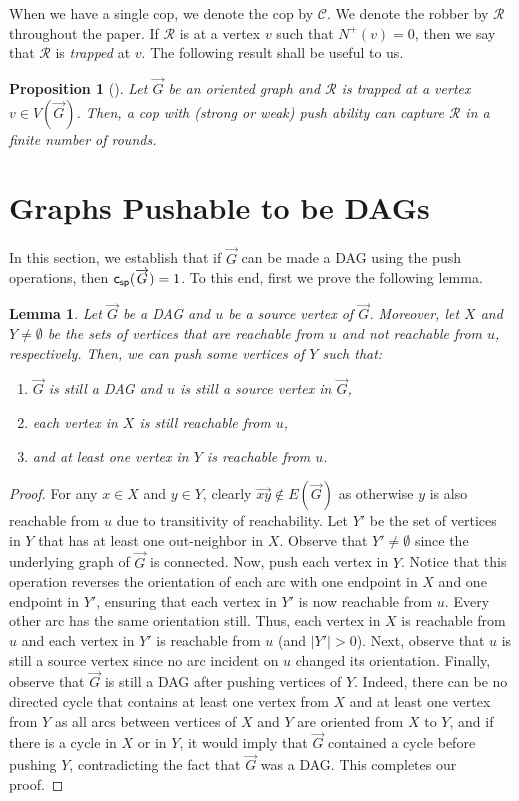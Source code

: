 \documentclass[a4paper,12pt]{amsart}
\newtheorem{proposition}[theorem]{Proposition}
\newtheorem{lemma}[theorem]{Lemma}
\newcommand{\R}{\mathcal{R}}
\newcommand{\C}{\mathcal{C}}
\newcommand{\csp}[1]{{\sf c_{sp}}(\overrightarrow{#1})}
\begin{document}
When we have a single cop, we denote the cop by $\C$. We denote the robber by $\R$ throughout the paper. 
If $\R$ is at a vertex $v$ such that $N^+(v) = 0$, then we say that $\R$ is \textit{trapped} at $v$. The following result shall be useful to us.
\begin{proposition}[\cite{das2023cops}]\label{P:trap}
    Let $\overrightarrow{G}$ be an oriented graph and $\R$ is trapped at a vertex $v\in V(\overrightarrow{G})$. Then, a cop with (strong or weak) push ability can capture $\R$ in a finite number of rounds.
\end{proposition}


\section{Graphs Pushable to be DAGs}
In this section, we establish that if $\overrightarrow{G}$ can be made a DAG using the push operations, then $\csp{G} = 1$. To this end, first we prove the following lemma. 
\begin{lemma}\label{L:pushDAG}
    Let $\overrightarrow{G}$ be a DAG and $u$ be a source vertex of $\overrightarrow{G}$. Moreover, let $X$ and $Y\neq \emptyset$ be the sets of vertices that are reachable from $u$ and  not reachable from $u$, respectively. Then, we can push some vertices of $Y$ such that:
    \begin{enumerate}
        \item $\overrightarrow{G}$ is still a DAG and $u$ is still a source vertex in $\overrightarrow{G}$,
        \item each vertex in $X$ is still reachable from $u$, 
        \item and at least one vertex in $Y$ is reachable from $u$.
    \end{enumerate}
\end{lemma}

\begin{proof}
    For any $x\in X$ and $y \in Y$, clearly $\overrightarrow{xy}\notin E(\overrightarrow{G})$ as otherwise $y$ is also reachable from $u$ due to transitivity of reachability. Let $Y'$ be the set of vertices in $Y$ that has at least one out-neighbor in $X$. Observe that $Y'\neq \emptyset$ since the underlying graph of $\overrightarrow{G}$ is connected. Now, push each vertex in $Y$. Notice that this operation reverses the orientation of each arc with one endpoint in $X$ and one endpoint in $Y'$, ensuring that each vertex in $Y'$ is now reachable from $u$. Every other arc has the same orientation still. Thus, each vertex in $X$ is reachable from $u$ and each vertex in $Y'$ is reachable from $u$ (and $|Y'|>0$). Next, observe that $u$ is still a source vertex since no arc incident on $u$ changed its orientation. Finally, observe that $\overrightarrow{G}$ is still a DAG after pushing vertices of $Y$. Indeed, there can be no directed cycle that contains at least one vertex from $X$ and at least one vertex from $Y$ as all arcs between vertices of $X$ and $Y$ are oriented from $X$ to $Y$, and if there is a cycle in $X$ or in $Y$, it would imply that $\overrightarrow{G}$ contained a cycle before pushing $Y$, contradicting the fact that $\overrightarrow{G}$ was a DAG. This completes our proof. 
\end{proof}
\end{document}
